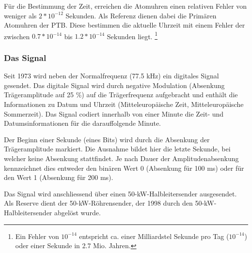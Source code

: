 Für die Bestimmung der Zeit, erreichen die Atomuhren einen relativen Fehler von weniger als $2*10^{-12}$ Sekunden.
Als Referenz dienen dabei die Primären Atomuhren der PTB.
Diese bestimmen die aktuelle Uhrzeit mit einem Fehler der zwischen $0.7 * 10^{-14}$ bis $1.2 * 10^{-14}$ Sekunden liegt.
\footnote{Ein Fehler von $10^{-14}$ entspricht ca. einer Milliardstel Sekunde pro Tag ($10^{-14} $) oder einer Sekunde in 2.7 Mio. Jahren.}

\subsubsection{Das Signal}
Seit 1973 wird neben der Normalfrequenz (77.5 kHz) ein digitales Signal gesendet. Das digitale Signal wird durch negative Modulation (Absenkung Trägeramplitude auf 25 \%) auf die Trägerfrequenz aufgebracht und enthält die Informationen zu Datum und Uhrzeit (Mitteleuropäische Zeit, Mitteleuropäische Sommerzeit). Das Signal codiert innerhalb von einer Minute die Zeit- und Datumsinformationen für die darauffolgende Minute.

Der Beginn einer Sekunde (eines Bits) wird durch die Absenkung der Trägeramplitude markiert. Die Ausnahme bildet hier die letzte Sekunde, bei welcher keine Absenkung stattfindet. Je nach Dauer der Amplitudenabsenkung kennzeichnet dies entweder den binären Wert 0 (Absenkung für 100 ms) oder für den Wert 1 (Absenkung für 200 ms).

Das Signal wird anschliessend über einen 50-kW-Halbleitersender ausgesendet. Als Reserve dient der 50-kW-Röhrensender, der 1998 durch den 50-kW-Halbleitersender abgelöst wurde.

